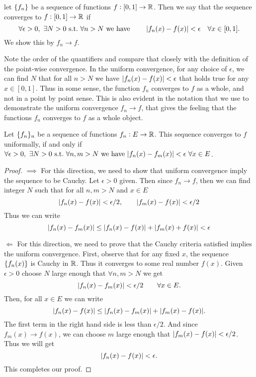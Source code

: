 \begin{definition}
	let $\{f_n\}$ be a sequence of functions $f:[0,1] \to \mathbb{R}$. Then we say that the sequence converges to $f: [0,1] \to \mathbb{R}$ if 
	\[ \forall \epsilon>0,\ \exists N>0 \st \forall n>N \wh \qquad \abs{f_n(x)-f(x)} < \epsilon \quad \forall x\in [0,1]. \]
	We show this by $f_n \to f$.
\end{definition}
\begin{remark}
	Note the order of the quantifiers and compare that closely with the definition of the point-wise convergence. In the uniform convergence, for any choice of $\epsilon$, we can find $N$ that for all $n>N$ we have $|f_n(x)- f(x)| <\epsilon$ that holds true for any $x\in [0,1]$. Thus in some sense, the function $f_n$ converges to $f$ as a whole, and not in a point by point sense. This is also evident in the notation that we use to demonstrate the uniform convergence $f_n \to f$, that gives the feeling that the functions $f_n$ converges to $f$ as a whole object.
\end{remark}

\begin{theorem}
	Let $\{f_n\}_n$ be a sequence of functions $f_n: E \to \mathbb{R}$. This sequence converges to $f$ uniformally, if and only if $\forall \epsilon>0,\ \exists N>0 \ \text{s.t.}\  \forall n,m>N \ \text{we have}\  |f_n(x) - f_m(x)| < \epsilon \ \forall x\in E$.
\end{theorem}
\begin{proof}
	$\boxed{\implies}$ For this direction, we need to show that uniform convergence imply the sequence to be Cauchy. Let $\epsilon>0$ given. Then since $f_n \to f$, then we can find integer $N$ such that for all $n,m>N$ and $x\in E$
	\[ |f_n(x)-f(x)|<\epsilon/2, \qquad |f_m(x)-f(x)|<\epsilon/2 \]
	Thus we can write
	\[ |f_n(x) - f_m(x)| \leq |f_n(x)-f(x)| + |f_m(x)+f(x)| < \epsilon \]
	
	\noindent $\boxed{\Longleftarrow}$ For this direction, we need to prove that the Cauchy criteria satisfied implies the uniform convergence. First, observe that for any fixed $x$, the sequence $\{f_n(x)\}$ is Cauchy in $\mathbb{R}$. Thus it converges to some real number $f(x)$. Given $\epsilon>0$ choose $N$ large enough that $\forall n,m > N$ we get
	\[ |f_n(x) - f_m(x)|  < \epsilon/2 \qquad \forall x\in E.\]
	Then, for all $x\in E$ we can write
	\[ |f_n(x) - f(x)| \leq |f_n(x) - f_m(x)| + |f_m(x) - f(x)|. \]
	The first term in the right hand side is less than $\epsilon/2$. And since $f_m(x) \to f(x)$, we can choose $m$ large enough that $|f_m(x) - f(x)| < \epsilon/2$. Thus we will get
	\[ |f_n(x) - f(x)| < \epsilon. \]
	This completes our proof. 
\end{proof}

